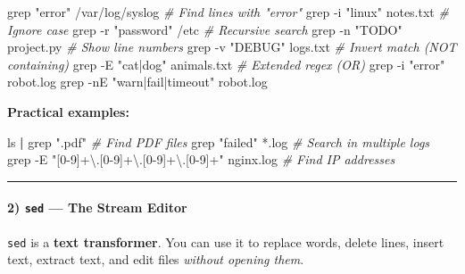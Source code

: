 \documentclass[
  english,
  paper=a4,
  oneside  ,captions=tableheading
]{scrartcl}
\newenvironment{Shaded}{}{}
\newcommand{\AttributeTok}[1]{\textcolor[rgb]{0.49,0.56,0.16}{#1}}
\newcommand{\CommentTok}[1]{\textcolor[rgb]{0.38,0.63,0.69}{\textit{#1}}}
\newcommand{\FunctionTok}[1]{\textcolor[rgb]{0.02,0.16,0.49}{#1}}
\newcommand{\KeywordTok}[1]{\textcolor[rgb]{0.00,0.44,0.13}{\textbf{#1}}}
\newcommand{\NormalTok}[1]{#1}
\newcommand{\PreprocessorTok}[1]{\textcolor[rgb]{0.74,0.48,0.00}{#1}}
\newcommand{\StringTok}[1]{\textcolor[rgb]{0.25,0.44,0.63}{#1}}
\begin{document}
\begin{Shaded}
\begin{Highlighting}[]
\FunctionTok{grep} \StringTok{"error"}\NormalTok{ /var/log/syslog                }\CommentTok{\# Find lines with "error"}
\FunctionTok{grep} \AttributeTok{{-}i} \StringTok{"linux"}\NormalTok{ notes.txt                   }\CommentTok{\# Ignore case}
\FunctionTok{grep} \AttributeTok{{-}r} \StringTok{"password"}\NormalTok{ /etc                     }\CommentTok{\# Recursive search}
\FunctionTok{grep} \AttributeTok{{-}n} \StringTok{"TODO"}\NormalTok{ project.py                   }\CommentTok{\# Show line numbers}
\FunctionTok{grep} \AttributeTok{{-}v} \StringTok{"DEBUG"}\NormalTok{ logs.txt                    }\CommentTok{\# Invert match (NOT containing)}
\FunctionTok{grep} \AttributeTok{{-}E} \StringTok{"cat|dog"}\NormalTok{ animals.txt               }\CommentTok{\# Extended regex (OR)}
\FunctionTok{grep} \AttributeTok{{-}i} \StringTok{"error"}\NormalTok{ robot.log}
\FunctionTok{grep} \AttributeTok{{-}nE} \StringTok{"warn|fail|timeout"}\NormalTok{ robot.log}
\end{Highlighting}
\end{Shaded}

\textbf{Practical examples:}

\begin{Shaded}
\begin{Highlighting}[]
\FunctionTok{ls} \KeywordTok{|} \FunctionTok{grep} \StringTok{".pdf"}                            \CommentTok{\# Find PDF files}
\FunctionTok{grep} \StringTok{"failed"} \PreprocessorTok{*}\NormalTok{.log                         }\CommentTok{\# Search in multiple logs}
\FunctionTok{grep} \AttributeTok{{-}E} \StringTok{"[0{-}9]+\textbackslash{}.[0{-}9]+\textbackslash{}.[0{-}9]+\textbackslash{}.[0{-}9]+"}\NormalTok{ nginx.log  }\CommentTok{\# Find IP addresses}
\end{Highlighting}
\end{Shaded}

\begin{center}\rule{0.5\linewidth}{0.5pt}\end{center}

\paragraph{\texorpdfstring{2) \texttt{sed} --- The Stream
Editor}{2) sed --- The Stream Editor}}\label{sed-the-stream-editor}

\texttt{sed} is a \textbf{text transformer}. You can use it to replace
words, delete lines, insert text, extract text, and edit files
\emph{without opening them}.
\end{document}
